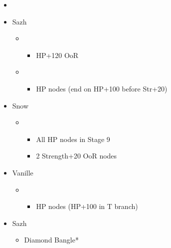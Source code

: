 \begin{menu}
	\begin{itemize}
	\paradigm
		\begin{itemize}
			\item {}%
				{\paradigmline{\com}{\com}{\com}}%
				{\paradigmline[4]{\com}{(\sen)}{(\med)}}%
				{\paradigmline{(\com)}{\sen}{(\rav)}}%
				{\paradigmline{(\syn)}{(\sen)}{(\med)}}%
				{\paradigmline{\rav}{\sen}{\rav}}%
				{\paradigmline{(\sen)}{(\sen)}{(\sen)}}%
		\end{itemize}
	\crystarium
		\begin{itemize}
			\item Sazh
				\begin{itemize}
					\item \rav
						\begin{itemize}
							\item HP+120 OoR
						\end{itemize}
					\item \syn
						\begin{itemize}
							\item HP nodes (end on HP+100 before Str+20)
						\end{itemize}
				\end{itemize}
			\item Snow
				\begin{itemize}
					\item \com
						\begin{itemize}
							\item All HP nodes in Stage 9
							\item 2 Strength+20 OoR nodes
						\end{itemize}
				\end{itemize}
			\item Vanille
				\begin{itemize}
					\item \sab
						\begin{itemize}
							\item HP nodes (HP+100 in T branch)
						\end{itemize}
				\end{itemize}								
		\end{itemize}
	\equip
		\begin{itemize}
			\item Sazh
				\begin{itemize}
					\item Diamond Bangle*

\end{itemize}
\end{itemize}
\end{itemize}
\end{menu}
